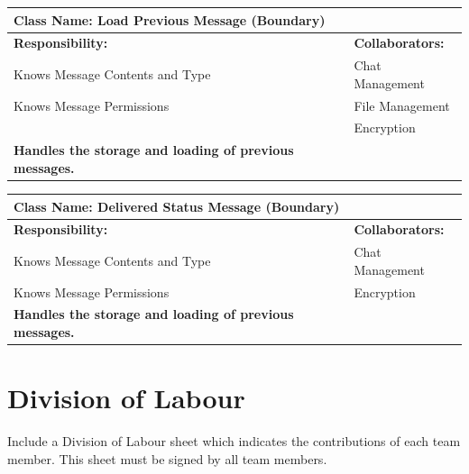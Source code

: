 \documentclass[]{article}
\begin{document}
	\begin{table}[ht]
		\centering
		\begin{tabular}{|p{7cm}|p{7cm}|}
		\hline 
		 \multicolumn{2}{|l|}{\textbf{Class Name:} Load Previous Message (Boundary)} \\
		\hline
		\textbf{Responsibility:} & \textbf{Collaborators:} \\
		\hline
            Knows Message Contents and Type & Chat Management\\
            Knows Message Permissions & File Management\\
            & Encryption\\
            
            \vspace{0.1in}
            \textbf{Handles the storage and loading of previous messages.}

		\vspace{1in} & \\
		\hline
  
		\end{tabular}
	\end{table}
	\begin{table}[ht]
		\centering
		\begin{tabular}{|p{7cm}|p{7cm}|}
		\hline 
		 \multicolumn{2}{|l|}{\textbf{Class Name:} Delivered Status Message (Boundary)} \\
		\hline
		\textbf{Responsibility:} & \textbf{Collaborators:} \\
		\hline
            Knows Message Contents and Type & Chat Management\\
            Knows Message Permissions & Encryption\\
            \vspace{0.1in}
            \textbf{Handles the storage and loading of previous messages.}

		\vspace{1in} & \\
		\hline
		\end{tabular}
	\end{table}



\clearpage

\clearpage

\appendix
\section{Division of Labour}
\label{sec:division_of_labour}
Include a Division of Labour sheet which indicates the contributions of each team member. This sheet must be signed by all team members.
\end{document}
